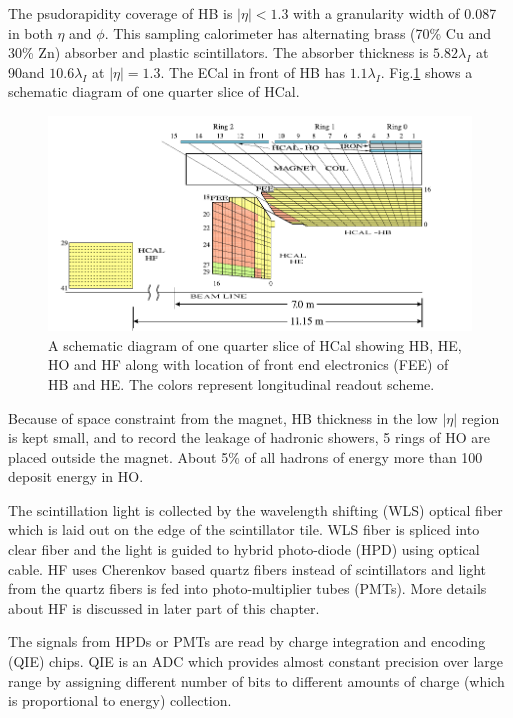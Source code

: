 The psudorapidity coverage of HB is $|\eta| < 1.3$ with a granularity width of 0.087 in both $\eta$ and $\phi$. This sampling calorimeter has alternating brass (70\% Cu and 30\% Zn) absorber and plastic scintillators. The absorber thickness is $5.82\lambda_I$ at 90\textdegree and $10.6\lambda_I$ at $|\eta| =1.3$. The ECal in front of HB has $1.1\lambda_I$. Fig.\ref{fig:Hcal_schematic} shows a schematic diagram of one quarter slice of HCal.
\begin{figure}[h!]
\centering
\includegraphics[width=0.9\linewidth]{../Figures/Chap2/Hcal_schematic}
\caption[Schematic diagram of HCal]{A schematic diagram of one quarter slice of HCal showing HB, HE, HO and HF along with location of front end electronics (FEE) of HB and HE. The colors represent longitudinal readout scheme.}
\label{fig:Hcal_schematic}
\end{figure}
Because of space constraint from the magnet, HB thickness in the low $|\eta|$ region is kept small, and to record the leakage of hadronic showers, 5 rings of HO are placed outside the magnet. About 5\% of all hadrons of energy more than 100 \gev deposit energy in HO.

The scintillation light is collected by the wavelength shifting (WLS) optical fiber which is laid out on the edge of the scintillator tile. WLS fiber is spliced into clear fiber and the light is guided to hybrid photo-diode (HPD) using optical cable. HF uses Cherenkov based quartz fibers instead of scintillators and light from the quartz fibers is fed into photo-multiplier tubes (PMTs). More details about HF is discussed in later part of this chapter.

The signals from HPDs or PMTs are read by charge integration and encoding (QIE) chips. QIE is an ADC which provides almost constant precision over large range by assigning different number of bits to different amounts of charge (which is proportional to energy) collection.

